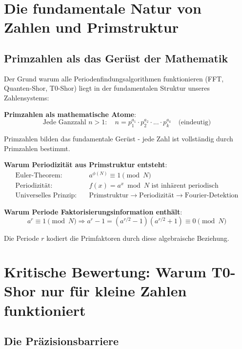 \documentclass[12pt,a4paper]{article}
\begin{document}
	\section{Die fundamentale Natur von Zahlen und Primstruktur}
	
	\subsection{Primzahlen als das Gerüst der Mathematik}
	
	Der Grund warum alle Periodenfindungsalgorithmen funktionieren (FFT, Quanten-Shor, T0-Shor) liegt in der fundamentalen Struktur unseres Zahlensystems:
	
	\textbf{Primzahlen als mathematische Atome}:
	\begin{equation}
		\text{Jede Ganzzahl } n > 1: \quad n = p_1^{a_1} \cdot p_2^{a_2} \cdot ... \cdot p_k^{a_k} \quad \text{(eindeutig)}
	\end{equation}
	
	Primzahlen bilden das fundamentale Gerüst - jede Zahl ist vollständig durch Primzahlen bestimmt.
	
	\textbf{Warum Periodizität aus Primstruktur entsteht}:
	\begin{align}
		\text{Euler-Theorem}: \quad &a^{\phi(N)} \equiv 1 \pmod{N} \\
		\text{Periodizität}: \quad &f(x) = a^x \bmod N \text{ ist inhärent periodisch} \\
		\text{Universelles Prinzip}: \quad &\text{Primstruktur} \rightarrow \text{Periodizität} \rightarrow \text{Fourier-Detektion}
	\end{align}
	
	\textbf{Warum Periode Faktorisierungsinformation enthält}:
	\begin{equation}
		a^r \equiv 1 \pmod{N} \Rightarrow a^r - 1 = (a^{r/2} - 1)(a^{r/2} + 1) \equiv 0 \pmod{N}
	\end{equation}
	
	Die Periode $r$ kodiert die Primfaktoren durch diese algebraische Beziehung.
	
	\section{Kritische Bewertung: Warum T0-Shor nur für kleine Zahlen funktioniert}
	
	\subsection{Die Präzisionsbarriere}
	
\end{document}
